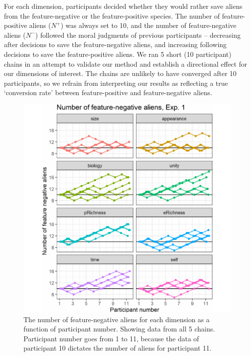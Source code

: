 \documentclass[10pt, letterpaper]{article}
\newenvironment{CodeChunk}{}{}
\begin{document}
For each dimension, participants decided whether they would rather save
aliens from the feature-negative or the feature-positive species. The
number of feature-positive aliens (\(N^+\)) was always set to 10, and
the number of feature-negative aliens (\(N^-\)) followed the moral
judgments of previous participants -- decreasing after decisions to save
the feature-negative aliens, and increasing following decisions to save
the feature-positive aliens. We ran 5 short (10 participant) chains in
an attempt to validate our method and establish a directional effect for
our dimensions of interest. The chains are unlikely to have converged
after 10 participants, so we refrain from interpreting our results as
reflecting a true `conversion rate' between feature-positive and
feature-negative aliens.

\begin{CodeChunk}
\begin{figure}[H]

{\centering \includegraphics{figs/mwjplot1-1} 

}

\caption[The number of feature-negative aliens for each dimension as a function of participant number]{The number of feature-negative aliens for each dimension as a function of participant number. Showing data from all 5 chains. Participant number goes from 1 to 11, because the data of participant 10 dictates the number of aliens for participant 11.}\label{fig:mwjplot1}
\end{figure}
\end{CodeChunk}
\end{document}
